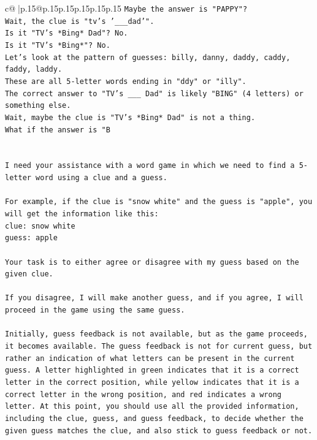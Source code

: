 \documentclass{article}
\begin{document}
{\begin{supertabular}{c@{$\;$}|p{.15\linewidth}@{}p{.15\linewidth}p{.15\linewidth}p{.15\linewidth}p{.15\linewidth}p{.15\linewidth}}
{{{\texttt{Maybe the answer is "PAPPY"?} \\
\texttt{Wait, the clue is "tv's '\_\_\_dad'".} \\
\texttt{Is it "TV's *Bing* Dad"? No.} \\
\texttt{Is it "TV's *Bing*"? No.} \\
\texttt{Let's look at the pattern of guesses: billy, danny, daddy, caddy, faddy, laddy.} \\
\texttt{These are all 5{-}letter words ending in "ddy" or "illy".} \\
\texttt{The correct answer to "TV's \_\_\_ Dad" is likely "BING" (4 letters) or something else.} \\
\texttt{Wait, maybe the clue is "TV's *Bing* Dad" is not a thing.} \\
\texttt{What if the answer is "B} \\
\\ 
\\ 
\texttt{I need your assistance with a word game in which we need to find a 5{-}letter word using a clue and a guess.} \\
\\ 
\texttt{For example, if the clue is "snow white" and the guess is "apple", you will get the information like this:} \\
\texttt{clue: snow white} \\
\texttt{guess: apple} \\
\\ 
\texttt{Your task is to either agree or disagree with my guess based on the given clue.} \\
\\ 
\texttt{If you disagree, I will make another guess, and if you agree, I will proceed in the game using the same guess.} \\
\\ 
\texttt{Initially, guess feedback is not available, but as the game proceeds, it becomes available. The guess feedback is not for current guess, but rather an indication of what letters can be present in the current guess. A letter highlighted in green indicates that it is a correct letter in the correct position, while yellow indicates that it is a correct letter in the wrong position, and red indicates a wrong letter. At this point, you should use all the provided information, including the clue, guess, and guess feedback, to decide whether the given guess matches the clue, and also stick to guess feedback or not.} \\
\\ 
}}}
\end{supertabular}}
\end{document}

